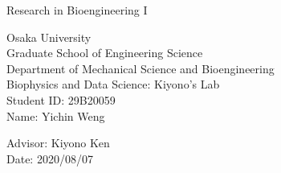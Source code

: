 \documentclass[12pt]{article}
\begin{document}
\setlength{\baselineskip}{15pt}
\thispagestyle{empty}
    \begin{center}
        \vspace{15cm}
        {\Huge Research in Bioengineering I}\\
    \end{center}
    \vspace{5cm}

    \begin{center}
        {\large Osaka University}\\
        \vspace{0.3cm}
        {\large Graduate School of Engineering Science}\\
        \vspace{0.3cm}
        {\large Department of Mechanical Science and Bioengineering}\\
        \vspace{0.3cm}
        {\large Biophysics and Data Science: Kiyono's Lab}\\
        \vspace{0.3cm}
        {\large Student ID: 29B20059}\\
        \vspace{0.3cm}
        {\large Name: Yichin Weng}\\
    \end{center}
    \vspace{2cm}

    \begin{center}
        {\large Advisor: Kiyono Ken}\\
        \vspace{2cm}
        {\large Date: 2020/08/07}
    \end{center}
    
    \newpage
    \thispagestyle{empty}
    \mbox{}

    \newpage
    \setcounter{page}{1} %

    

    
    
    \clearpage
\end{document}
